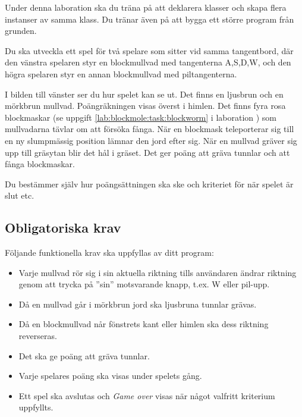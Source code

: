 {
\setlength{\currentparskip}{\parskip}%
\setlength{\currentparindent}{\parindent}%
\hfill%
\begin{minipage}{0.46\textwidth}
\setlength{\parskip}{\currentparskip}%
\setlength{\parindent}{\currentparindent}%
\noindent Under denna laboration ska du träna på att deklarera klasser och skapa flera instanser av samma klass. Du tränar även på att bygga ett större program från grunden.

Du ska utveckla ett spel för två spelare som sitter vid samma tangentbord, där den vänstra spelaren styr en blockmullvad med tangenterna A,S,D,W, och den högra spelaren styr en annan blockmullvad med piltangenterna.

I bilden till vänster ser du hur spelet kan se ut. Det finns en ljusbrun och en mörkbrun mullvad. Poängräkningen visas överst i himlen. Det finns fyra rosa blockmaskar (se uppgift \ref{lab:blockmole:task:blockworm} i laboration ) som mullvadarna tävlar om att försöka fånga. När en blockmask teleporterar sig till en ny slumpmässig position lämnar den jord efter sig. När en mullvad gräver sig upp till gräsytan blir det hål i gräset.
Det ger poäng att gräva tunnlar och att fånga blockmaskar.

Du bestämmer själv hur poängsättningen ska ske och kriteriet för när spelet är slut etc.
\end{minipage}%
}



\subsection{Obligatoriska krav}

Följande funktionella krav ska uppfyllas av ditt program:
\begin{itemize}[nosep, label={$\square$},]
\item Varje mullvad rör sig i sin aktuella riktning tills användaren ändrar riktning genom att trycka på ''sin'' motsvarande knapp, t.ex. W eller pil-upp.
\item Då en mullvad går i mörkbrun jord ska ljusbruna tunnlar grävas.
\item Då en blockmullvad når fönstrets kant eller himlen ska dess riktning reverseras.
\item Det ska ge poäng att gräva tunnlar.
\item Varje spelares poäng ska visas under spelets gång.
\item Ett spel ska avslutas och \emph{Game over} visas när något valfritt kriterium uppfyllts.
\end{itemize}

